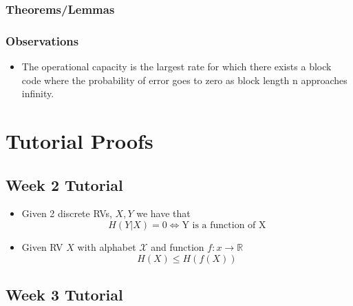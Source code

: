 \documentclass{article}
\begin{document}
\subsubsection{Theorems/Lemmas}
\subsubsection{Observations}
\begin{itemize}
    \item The operational capacity is the largest rate for which there exists a block code where the probability of error goes to zero as block length n approaches infinity.
\end{itemize}

\section{Tutorial Proofs}
\subsection{Week 2 Tutorial}
\begin{itemize}
    \item Given 2 discrete RVs, \(X, Y\) we have that
    \[H(Y|X) = 0 \Longleftrightarrow \text{Y is a function of X}\]
    \item Given RV \(X\) with alphabet \(\mathcal{X}\) and function \(f: x \to \mathbb{R}\)
    \[H(X) \leq H(f(X))\]
\end{itemize}
\subsection{Week 3 Tutorial}

\end{document}
